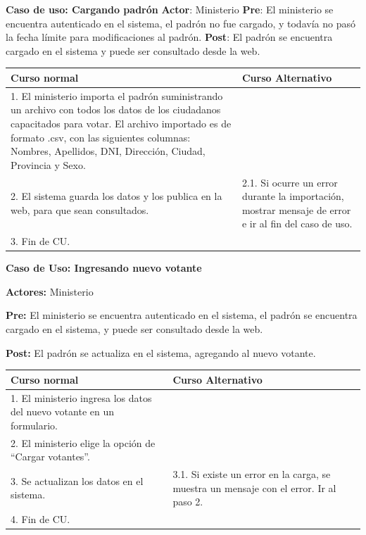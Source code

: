 \textbf{Caso de uso: Cargando padrón}
\textbf{Actor}: Ministerio
\textbf{Pre}: El ministerio se encuentra autenticado en el sistema, el padrón no fue cargado, y todavía no pasó la fecha límite para modificaciones al padrón.
\textbf{Post}: El padrón se encuentra cargado en el sistema y puede ser consultado desde la web.
\begin{table}[h!]
	
 \begin{tabular}{|p{7.5cm} | p{7.5cm}|} 
 \hline
 \textbf{Curso normal} & \textbf{Curso Alternativo} \\
 \hline
1. El ministerio importa el padrón suministrando un archivo con todos los datos de los ciudadanos capacitados para votar.
El archivo importado es de formato .csv, con las siguientes columnas: Nombres, Apellidos, DNI, Dirección, Ciudad, Provincia y Sexo. & \\
\hline

2. El sistema guarda los datos y los publica en la web, para que sean consultados. &
2.1. Si ocurre un error durante la importación, mostrar mensaje de error e ir al fin del caso de uso. \\
\hline
3. Fin de CU. & \\

 \end{tabular}

\end{table}





\textbf{Caso de Uso: Ingresando nuevo votante}

\textbf{Actores:} Ministerio

\textbf{Pre:} El ministerio se encuentra autenticado en el sistema, el padrón se encuentra cargado en el sistema, y puede ser consultado desde la web.

\textbf{Post:} El padrón se actualiza en el sistema, agregando al nuevo votante.
\begin{table}[h!]
	
 \begin{tabular}{|p{7.5cm} | p{7.5cm}|} 
 \hline
 \textbf{Curso normal} & \textbf{Curso Alternativo} \\
 \hline

1. El ministerio ingresa los datos del nuevo votante en un formulario. & \\
\hline

2. El ministerio elige la opción de “Cargar votantes”. & \\
\hline

3. Se actualizan los datos en el sistema. & 3.1. Si existe un error en la carga, se muestra un mensaje con el error. Ir al paso 2. \\
\hline
4. Fin de CU. & \\
 \hline
 \end{tabular}

\end{table}

